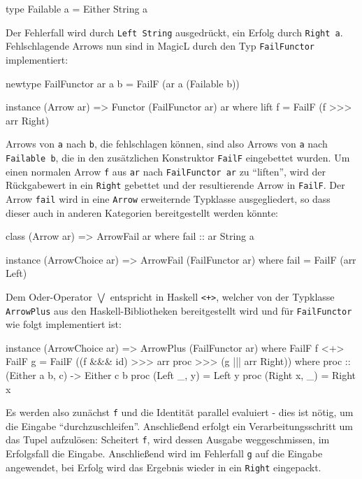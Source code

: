 \documentclass[11pt, a4paper, bibgerm]{book}
\newcommand\icode[1]{\lstinline?#1?}
\begin{document}
\begin{code}
type Failable a = Either String a
\end{code}

Der Fehlerfall wird durch \icode{Left String} ausgedrückt, ein Erfolg
durch \icode{Right a}. Fehlschlagende Arrows nun sind in MagicL durch den
Typ \icode{FailFunctor} implementiert:

\begin{code}
newtype FailFunctor ar a b = FailF (ar a (Failable b))

instance (Arrow ar) => Functor (FailFunctor ar) ar where
    lift f = FailF (f >>> arr Right)
\end{code} %

Arrows von \icode{a} nach \icode{b}, die fehlschlagen können, sind also
Arrows von \icode{a} nach \icode{Failable b}, die in den zusätzlichen
Konstruktor \icode{FailF} eingebettet wurden. Um einen normalen Arrow
\icode{f} aus \icode{ar} nach \icode{FailFunctor ar} zu "`liften"', wird
der Rückgabewert in ein \icode{Right} gebettet und der resultierende
Arrow in \icode{FailF}.
Der Arrow \icode{fail} wird in eine \icode{Arrow} erweiternde Typklasse
ausgegliedert, so dass dieser auch in anderen Kategorien bereitgestellt
werden könnte:

\begin{code}
class (Arrow ar) => ArrowFail ar where
  fail :: ar String a

instance (ArrowChoice ar) => ArrowFail (FailFunctor ar) where
  fail = FailF (arr Left)
\end{code}

Dem Oder-Operator $\bigvee$ entspricht in Haskell \icode{<+>}, welcher
von der Typklasse \icode{ArrowPlus} aus den Haskell-Bibliotheken
bereitgestellt wird und für \icode{FailFunctor} wie folgt implementiert
ist:

\begin{code}
instance (ArrowChoice ar) => ArrowPlus (FailFunctor ar) where
  FailF f <+> FailF g = FailF ((f &&& id) >>> arr proc >>> (g ||| arr Right))
   where proc :: (Either a b, c) -> Either c b
         proc (Left  _, y) = Left y
         proc (Right x, _) = Right x
\end{code} %

Es werden also zunächst \icode{f} und die Identität parallel evaluiert -
dies ist nötig, um die Eingabe "`durchzuschleifen"'. Anschließend
erfolgt ein Verarbeitungsschritt um das Tupel aufzulösen: Scheitert
\icode{f}, wird dessen Ausgabe weggeschmissen, im Erfolgsfall die
Eingabe. Anschließend wird im Fehlerfall \icode{g} auf die Eingabe
angewendet, bei Erfolg wird das Ergebnis wieder in ein \icode{Right} eingepackt.
\end{document}
